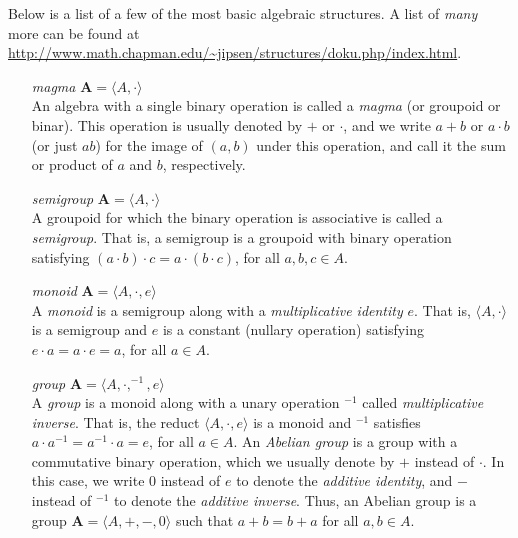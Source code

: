 \documentclass[12pt]{article}
\theoremstyle{plain}
\theoremstyle{definition}
\theoremstyle{remark}
\theoremstyle{remark}
\numberwithin{theorem}{section}
\numberwithin{equation}{section}
\newcommand{\<}{\ensuremath{\langle}}
\renewcommand{\>}{\ensuremath{\rangle}}
\newcommand{\bA}{\ensuremath{\mathbf{A}}}
\begin{document}
Below is a list of a few of the most basic algebraic structures. 
A list of \emph{many} more can be found at
{\small \url{http://www.math.chapman.edu/~jipsen/structures/doku.php/index.html}}.

\begin{itemize}
\item[\emph{magma}] $\bA = \langle A, \cdot\rangle$ \\
An algebra with a single binary operation is called a \emph{magma} 
(or groupoid or binar). This operation is 
usually denoted by $+$ or $\cdot$, and we write $a+b$ or $a\cdot b$ 
(or just $ab$) for the image of $(a, b)$ under
this operation, and call it the sum or product of $a$ and $b$, respectively.

\item[\emph{semigroup}] $\bA = \langle A, \cdot\rangle$ \\
A groupoid for which 
the binary operation is associative is called a \emph{semigroup}. That is,
a semigroup is a groupoid with binary operation satisfying 
$(a\cdot b)\cdot c = a\cdot (b\cdot c)$, for all $a, b, c \in A$.

\item[\emph{monoid}] $\bA = \langle A, \cdot, e\rangle$\\
 A \emph{monoid} 
  is a semigroup along with a \emph{multiplicative identity} $e$. That is, 
$\langle A, \cdot \rangle$ is a semigroup and $e$ is a constant 
(nullary operation) satisfying $e\cdot a = a\cdot e = a$, for all $a\in A$.

\item[\emph{group}] $\bA = \langle A, \cdot, ^{-1}, e\rangle$\\
A \emph{group} is a monoid along with a unary operation $^{-1}$ called \emph{multiplicative inverse}.
That is, the reduct $\langle A, \cdot, e \rangle$ is a monoid and
$^{-1}$ satisfies $a\cdot a^{-1} =  a^{-1}\cdot a = e$, for all $a\in A$. 
An \emph{Abelian group} is a group with a commutative binary
operation, which we usually denote by $+$ instead
of $\cdot$.  In this case, we write $0$ instead of $e$ to
denote the \emph{additive identity}, and $-$ instead of
$^{-1}$ to denote the \emph{additive inverse}.  Thus, an Abelian
group is a group $\bA = \langle A, +, -, 0\rangle$ such that 
$a+b = b+a$ for all $a, b \in A$.



\end{itemize}
\end{document}
